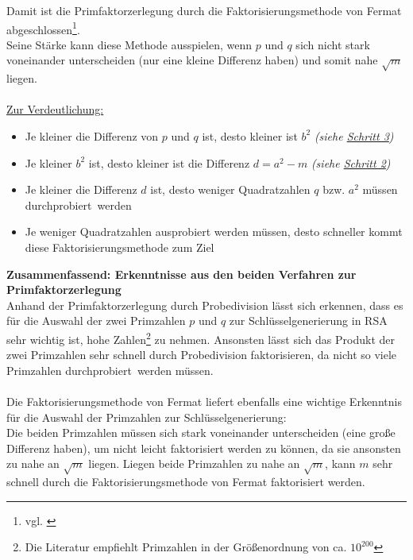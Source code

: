 Damit ist die Primfaktorzerlegung durch die Faktorisierungsmethode von Fermat abgeschlossen\footnote{vgl. \cite{faktorisierung_fermat}}.\\
Seine Stärke kann diese Methode ausspielen, wenn $p$ und $q$ sich nicht stark voneinander unterscheiden (nur eine kleine Differenz haben) und somit nahe $\sqrt{m}$ liegen.\\
\\
\underline{Zur Verdeutlichung:}
\begin{itemize}
\item Je kleiner die Differenz von $p$ und $q$ ist, desto kleiner ist $b^{2}$ \quad \textit{(siehe \underline{Schritt 3})}
\item Je kleiner $b^{2}$ ist, desto kleiner ist die Differenz $d=a^{2}-m$ \quad \textit{(siehe \underline{Schritt 2})}
\item Je kleiner die Differenz $d$ ist, desto weniger Quadratzahlen $q$ bzw. $a^{2}$ müssen \glqq durchprobiert\grqq~werden
\item Je weniger Quadratzahlen ausprobiert werden müssen, desto schneller kommt diese Faktorisierungsmethode zum Ziel
\end{itemize}  
\textbf{Zusammenfassend: Erkenntnisse aus den beiden Verfahren zur Primfaktorzerlegung}\\
Anhand der Primfaktorzerlegung durch Probedivision lässt sich erkennen, dass es für die Auswahl der zwei Primzahlen $p$ und $q$ zur Schlüsselgenerierung in RSA sehr wichtig ist, hohe Zahlen\footnote{Die Literatur empfiehlt Primzahlen in der Größenordnung von ca. $10^{200}$} zu nehmen. Ansonsten lässt sich das Produkt der zwei Primzahlen sehr schnell durch Probedivision faktorisieren, da nicht so viele Primzahlen \glqq durchprobiert\grqq~werden müssen.\\
\\
Die Faktorisierungsmethode von Fermat liefert ebenfalls eine wichtige Erkenntnis für die Auswahl der Primzahlen zur Schlüsselgenerierung:\\
Die beiden Primzahlen müssen sich stark voneinander unterscheiden (eine große Differenz haben), um nicht leicht faktorisiert werden zu können, da sie ansonsten zu nahe an $\sqrt{m}$ liegen.
Liegen beide Primzahlen zu nahe an $\sqrt{m}$, kann $m$ sehr schnell durch die Faktorisierungsmethode von Fermat faktorisiert werden.
